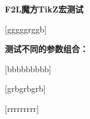\documentclass[UTF8]{ctexart}
\begin{document}
\begin{center}
\LARGE \textbf{F2L魔方TikZ宏测试}
\end{center}

\vspace{2cm}

\begin{center}
[gggggrggb]
\end{center}

\vfill

\begin{center}
\textbf{测试不同的参数组合：}
\end{center}

\vspace{1cm}

\begin{center}
[bbbbbbbbb]
\end{center}

\vfill

\begin{center}
[grbgrbgrb]
\end{center}

\vfill

\begin{center}
[rrrrrrrrr]
\end{center}
\end{document}
